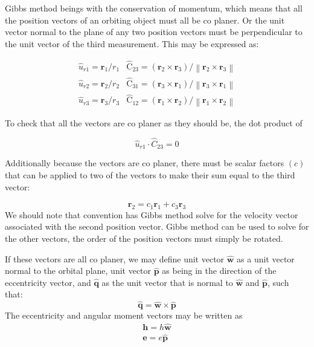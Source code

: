 \documentclass[12pt]{article}
\begin{document}
	Gibbs method beings with the conservation of momentum, which means that all the position vectors of an orbiting object must all be co planer. Or the unit vector normal to the plane of any two position vectors must be perpendicular to the unit vector of the third measurement. This may be expressed as:
	
	\begin{eqnarray}
	\hat { { u } } _ { r 1 } = \mathbf { r } _ { 1 } / r _ { 1 }& \hat { \mathrm { C } } _ { 23 } = \left( \mathbf { r } _ { 2 } \times \mathbf { r } _ { 3 } \right) / \left\| \mathbf { r } _ { 2 } \times \mathbf { r } _ { 3 } \right\|\\
	\hat {{ u } } _ { r 2 } = \mathbf { r } _ { 2 } / r _ { 2 }&\hat { \mathrm { C } } _ { 31 } = \left( \mathbf { r } _ { 3 } \times \mathbf { r } _ { 1} \right) / \left\| \mathbf { r } _ { 3 } \times \mathbf { r } _ { 1 } \right\|\\
	\hat {{ u } } _ { r 3 } = \mathbf { r } _ { 3 } / r _ { 3} & \hat { \mathrm { C } } _ { 12 } = \left( \mathbf { r } _ { 1 } \times \mathbf { r } _ { 2 } \right) / \left\| \mathbf { r } _ { 1} \times \mathbf { r } _ { 2 } \right\|
	\end{eqnarray}
	
	To check that all the vectors are co planer as they should be, the dot product of 
	
	\begin{equation}
	\hat {  { u } } _ { r 1 } \cdot \hat {  { C } } _ { 23 } = 0
	\end{equation}
	
	Additionally because the vectors are co planer, there must be scalar factors $(c)$ that can be applied to two of the vectors to make their sum equal to the third vector:
	
	\begin{equation}
	\mathbf{r}_2 = c_1 \mathbf{ r }_1 + c_3 \mathbf{r}_3
	\label{eqn:cs}
	\end{equation}
	We should note that convention has Gibbs method solve for the velocity vector associated with the second position vector. Gibbs method can be used to solve for the other vectors, the order of the position vectors must simply be rotated.
	
		
	If these vectors are all co planer, we may define unit vector $\hat{\mathbf{w}}$ as a unit vector normal to the orbital plane, unit vector $\hat{\mathbf{p}}$ as being in the direction of the eccentricity vector, and $\hat{\mathbf{q}}$ as the unit vector that is normal to $\hat{\mathbf{w}}$ and $\hat{\mathbf{p}}$, such that:
	\begin{equation}
	\hat{\mathbf{q}}=\hat{\mathbf{w}}\times\hat{\mathbf{p}}
	\label{eqn:cross_wpq}
	\end{equation}
	The eccentricity and angular moment vectors may be written as 
	\begin{eqnarray}
	\mathbf{h}=h\hat{\mathbf{w}}\\
	\mathbf{e}=e\hat{\mathbf{p}}
	\end{eqnarray}
	
\end{document}

